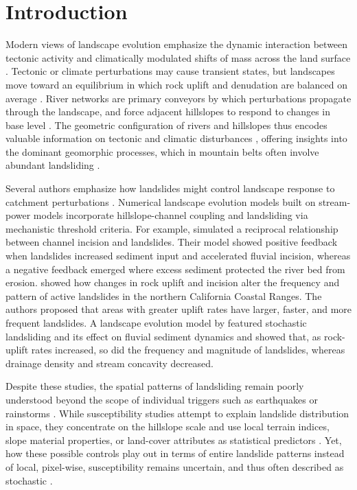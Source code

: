 \documentclass[draft]{agujournal2019}
\begin{document}
\section{Introduction}
\par Modern views of landscape evolution emphasize the dynamic interaction between tectonic activity and climatically modulated shifts of mass across the land surface \cite{Davies2021, Whittaker2012, Irasema2002}. Tectonic or climate perturbations may cause transient states, but landscapes move toward an equilibrium in which rock uplift and denudation are balanced on average \cite{Whittaker2012, Wobus2006, Whipple2004}. River networks are primary conveyors by which perturbations propagate through the landscape, and force adjacent hillslopes to respond to changes in base level \cite{Whipple2004, howard1994}. The geometric configuration of rivers and hillslopes thus encodes valuable information on tectonic and climatic disturbances \cite{whipple2017, stock1999}, offering insights into the dominant geomorphic processes, which in mountain belts often involve abundant landsliding \cite{Larsen2012, korup2010, Montgomery2002, Campforts2020, Broeckx2020}. 

\par Several authors emphasize how landslides might control landscape response to catchment perturbations \cite{montgomery2001slope}. Numerical landscape evolution models built on stream-power models incorporate hillslope-channel coupling and landsliding via mechanistic threshold criteria. For example,  simulated a reciprocal relationship between channel incision and landslides. Their model showed positive feedback when landslides increased sediment input and accelerated fluvial incision, whereas a negative feedback emerged where excess sediment protected the river bed from erosion.  showed how changes in rock uplift and incision alter the frequency and pattern of active landslides in the northern California Coastal Ranges. The authors proposed that areas with greater uplift rates have larger, faster, and more frequent landslides. A landscape evolution model by  featured stochastic landsliding and its effect on fluvial sediment dynamics and showed that, as rock-uplift rates increased, so did the frequency and magnitude of landslides, whereas drainage density and stream concavity decreased.

\par Despite these studies, the spatial patterns of landsliding remain poorly understood beyond the scope of individual triggers such as earthquakes or rainstorms \cite{yanites2018}. While susceptibility studies attempt to explain landslide distribution in space, they concentrate on the hillslope scale and use local terrain indices, slope material properties, or land-cover attributes as statistical predictors \cite{reichenbach2018, soeters1996, montgomery1994}. Yet, how these possible controls play out in terms of entire landslide patterns instead of local, pixel-wise, susceptibility remains uncertain, and thus often described as stochastic \cite{Benda1997}. 
\end{document}
